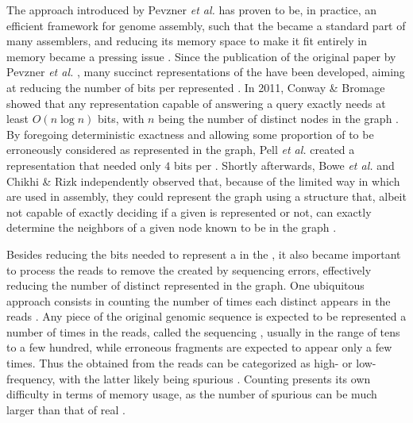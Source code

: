 The approach introduced by Pevzner \emph{et al.} has proven to be, in practice, an efficient framework for genome assembly, such that the \dBG became a standard part of many assemblers, and reducing its memory space to make it fit entirely in memory became a pressing issue \cite{Chikhi2014}. Since the publication of the original paper by Pevzner \emph{et al.} \cite{Pevzner2001}, many succinct representations of the \dBG have been developed, aiming at reducing the number of bits per represented \kmer. In 2011, Conway \& Bromage showed that any \dBG representation capable of answering a \kmer query exactly needs at least $O(n \log n)$ bits, with $n$ being the number of distinct nodes in the graph \cite{Conway2011}. By foregoing deterministic exactness and allowing some proportion of  to be erroneously considered as represented in the graph, Pell \emph{et al.} created a representation that needed only $4$ bits per \kmer \cite{Pell2012}. Shortly afterwards, Bowe \emph{et al.} and Chikhi \& Rizk independently observed that, because of the limited way in which  are used in assembly, they could represent the graph using a structure that, albeit not capable of exactly deciding if a given \kmer is represented or not, can exactly determine the neighbors of a given node known to be in the graph \cite{Bowe2012, Chikhi2013}.

Besides reducing the bits needed to represent a \kmer in the \dBG, it also became important to process the reads to remove the  created by sequencing errors, effectively reducing the number of distinct  represented in the graph. One ubiquitous approach consists in counting the number of times each distinct \kmer appears in the reads \cite{Zhang2014}. Any piece of the original genomic sequence is expected to be represented a  number of times in the reads, called the sequencing , usually in the range of tens to a few hundred, while erroneous fragments are expected to appear only a few times. Thus the  obtained from the reads can be categorized as high- or low-frequency, with the latter likely being spurious \cite{Conway2011, Ghosh2019}. Counting \kmers presents its own difficulty in terms of memory usage, as the number of spurious  can be much larger than that of real  \cite{Conway2011, Melsted2011, Zhang2014, Ghosh2019}.

